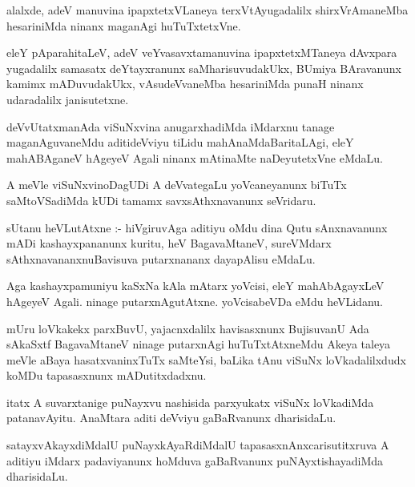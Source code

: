 \documentclass{article}
\begin{document}
\begin{mn}
alalxde, adeV manuvina ipapxtetxVLaneya terxVtAyugadalilx shirxVrAmaneMba 
hesariniMda ninanx maganAgi huTuTxtetxVne.
\end{mn}

\begin{mn}
eleY pAparahitaLeV, adeV veYvasavxtamanuvina ipapxtetxMTaneya 
dAvxpara yugadalilx  samasatx deYtayxranunx saMharisuvudakUkx, BUmiya
BAravanunx kamimx mADuvudakUkx, vAsudeVvaneMba hesariniMda punaH ninanx 
udaradalilx  janisutetxne.
\end{mn}

\begin{mn}
deVvUtatxmanAda viSuNxvina anugarxhadiMda iMdarxnu tanage maganAguvaneMdu 
aditideVviyu tiLidu mahAnaMdaBaritaLAgi, eleY mahABAganeV hAgeyeV Agali 
ninanx mAtinaMte naDeyutetxVne eMdaLu.
\end{mn}

\begin{mn}
A meVle viSuNxvinoDagUDi A deVvategaLu yoVcaneyanunx biTuTx 
saMtoVSadiMda kUDi tamamx savxsAthxnavanunx seVridaru.
\end{mn}

\begin{mn}
sUtanu heVLutAtxne :- hiVgiruvAga aditiyu oMdu dina Qutu sAnxnavanunx mADi 
kashayxpananunx kuritu, heV BagavaMtaneV, sureVMdarx sAthxnavananxnuBavisuva 
putarxnananx dayapAlisu eMdaLu.
\end{mn}

\begin{mn}
Aga kashayxpamuniyu kaSxNa kAla mAtarx yoVcisi, eleY mahAbAgayxLeV hAgeyeV
Agali. ninage putarxnAgutAtxne. yoVcisabeVDa eMdu heVLidanu.
\end{mn}

\begin{mn}
mUru loVkakekx parxBuvU, yajacnxdalilx havisasxnunx BujisuvanU Ada 
sAkaSxtf BagavaMtaneV ninage putarxnAgi huTuTxtAtxneMdu Akeya taleya meVle 
aBaya hasatxvaninxTuTx saMteYsi, baLika tAnu viSuNx loVkadalilxdudx koMDu
tapasasxnunx mADutitxdadxnu.
\end{mn}

\begin{mn}
itatx A suvarxtanige puNayxvu nashisida parxyukatx viSuNx loVkadiMda
patanavAyitu. AnaMtara  aditi deVviyu gaBaRvanunx dharisidaLu.
\end{mn}

\begin{mn}
satayxvAkayxdiMdalU puNayxkAyaRdiMdalU tapasasxnAnxcarisutitxruva A 
aditiyu iMdarx padaviyanunx hoMduva gaBaRvanunx puNAyxtishayadiMda dharisidaLu.
\end{mn}
\end{document}
